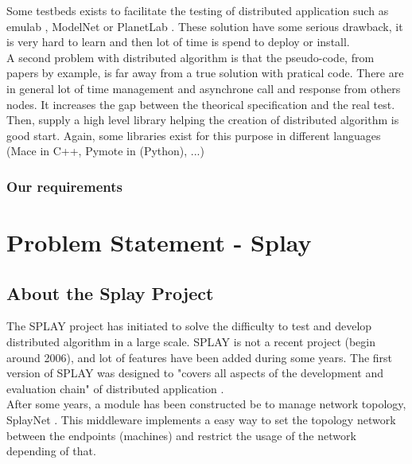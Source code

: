 \documentclass{eplmastersthesis}
\begin{document}
      Some testbeds exists to facilitate the testing of distributed application such as emulab \cite{Emulab}
      , ModelNet \cite{ModelNet} or PlanetLab \cite{PlanetLab}. These solution have some serious 
      drawback, it is very hard to learn and then lot of time is spend to deploy or install. \\

      A second problem with distributed algorithm is that the pseudo-code, from papers by example, is 
      far away from a true solution with pratical code. There are in general lot of time management and
      asynchrone call and response from others nodes. It increases the gap between the theorical 
      specification and the real test. Then, supply a high level library helping the creation of distributed algorithm
      is good start. Again, some libraries exist for this purpose in different languages (Mace \cite{Mace} in C++,
      Pymote \cite{Pymote} in (Python), ...) \\

    \subsection{Our requirements}

    

  \chapter{Problem Statement - Splay}

  \section{About the Splay Project}

    The SPLAY project has initiated to solve the difficulty to test and
    develop distributed algorithm in a large scale. SPLAY is not a recent
    project (begin around 2006), and lot of features have been added during
    some years. The first version of SPLAY  was designed to "covers all
    aspects of the development and evaluation chain" of distributed
    application \cite{SPLAY}. \\

    After some years, a module has been constructed be to manage network
    topology, SplayNet \cite{SplayNet}. This middleware implements a easy
    way to set the topology network between the endpoints (machines) and
    restrict the usage of the network depending of that.
\end{document}
